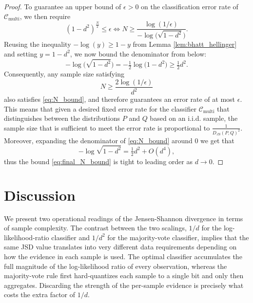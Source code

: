 \documentclass{article}
\begin{document}
\begin{proof}
To guarantee an upper bound of $\epsilon>0$ on the classification error rate of $\mathcal{C}_{\text{multi}}$, we then require
\begin{equation}
    (1-d^2)^\frac{N}{2}\leq \epsilon \iff N \geq \frac{\log(1/\epsilon)}{-\log \Big(\sqrt{1-d^2}\Big)}.
\label{eq:N_bound}
\end{equation}
Reusing the inequality $-\log(y)\geq 1-y$ from Lemma \ref{lem:bhatt_hellinger} and setting $y=1-d^2$, we now bound the denominator from below:
\begin{equation}
    -\log\Big(\sqrt{1-d^2}\Big) = -\tfrac{1}{2}\log\big(1-d^2\big) \geq \tfrac{1}{2}d^2.
\label{eq:log_lower_bound}
\end{equation}
Consequently, any sample size satisfying
\begin{equation}
    N \geq \frac{2\log(1/\epsilon)}{d^2}
\label{eq:final_N_bound}
\end{equation}
also satisfies \eqref{eq:N_bound}, and therefore guarantees an error rate of at most $\epsilon$. This means that given a desired fixed error rate for the classifier $\mathcal{C}_{\text{multi}}$ that distinguishes between the distributions $P$ and $Q$ based on an i.i.d. sample, the sample size that is sufficient to meet the error rate is proportional to $\frac{1}{D_{JS}(P,Q)^2}$. Moreover, expanding the denominator of \eqref{eq:N_bound} around 0 we get that
\begin{equation}
    -\log\sqrt{1-d^2} = \tfrac{1}{2}d^2 + O(d^4),
\end{equation}
thus the bound \eqref{eq:final_N_bound} is tight to leading order as $d\to 0$.
\end{proof}

\section*{Discussion}

We present two operational readings of the Jensen-Shannon divergence in terms of sample complexity. The contrast between the two scalings, $1/d$ for the log-likelihood-ratio classifier and $1/d^{2}$ for the majority-vote classifier, implies that the same JSD value translates into very different data requirements depending on how the evidence in each sample is used. The optimal classifier accumulates the full magnitude of the log-likelihood ratio of every observation, whereas the majority-vote rule first hard-quantizes each sample to a single bit and only then aggregates. Discarding the strength of the per-sample evidence is precisely what costs the extra factor of $1/d$.
\end{document}
